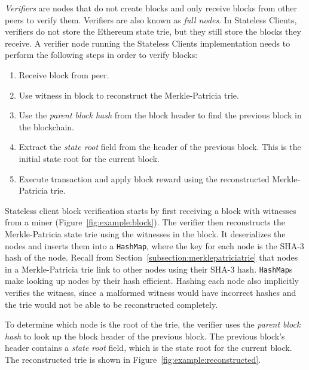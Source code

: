 \documentclass[12pt]{article}
\newcommand{\System}{Stateless Clients\xspace}
\begin{document}
\emph{Verifiers} are nodes that do not create blocks and only receive blocks from other peers to verify them. Verifiers are also known as \emph{full nodes}. In \System, verifiers do not store the Ethereum state trie, but they still store the blocks they receive. A verifier node running the \System implementation needs to perform the following steps in order to verify blocks:

\begin{enumerate}
  \item Receive block from peer.
  \item Use witness in block to reconstruct the Merkle-Patricia trie.
  \item Use the \emph{parent block hash} from the block header to find the previous block in the blockchain.
  \item Extract the \emph{state root} field from the header of the previous block. This is the initial state root for the current block.
  \item Execute transaction and apply block reward using the reconstructed Merkle-Patricia trie.
\end{enumerate}

Stateless client block verification starts by first receiving a block with witnesses from a miner (Figure~\ref{fig:example:block}). The verifier then reconstructs the Merkle-Patricia state trie using the witnesses in the block. It deserializes the nodes and inserts them into a \texttt{HashMap}, where the key for each node is the SHA-3 hash of the node. Recall from Section~\ref{subsection:merklepatriciatrie} that nodes in a Merkle-Patricia trie link to other nodes using their SHA-3 hash. \texttt{HashMap}s make looking up nodes by their hash efficient. Hashing each node also implicitly verifies the witness, since a malformed witness would have incorrect hashes and the trie would not be able to be reconstructed completely.

To determine which node is the root of the trie, the verifier uses the \emph{parent block hash} to look up the block header of the previous block. The previous block's header contains a \emph{state root} field, which is the state root for the current block. The reconstructed trie is shown in Figure~\ref{fig:example:reconstructed}.
\end{document}
